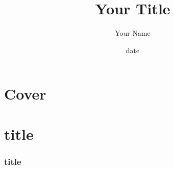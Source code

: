\documentclass[xcolor=svgnames]{beamer}
\begin{document}
\title{Your Title} 
\author{Your Name}
\date{date}

\section{Cover}
\begin{frame}
\titlepage
\end{frame}

\section{title}
\begin{frame}
\frametitle{title} %

\end{frame}
\end{document}
